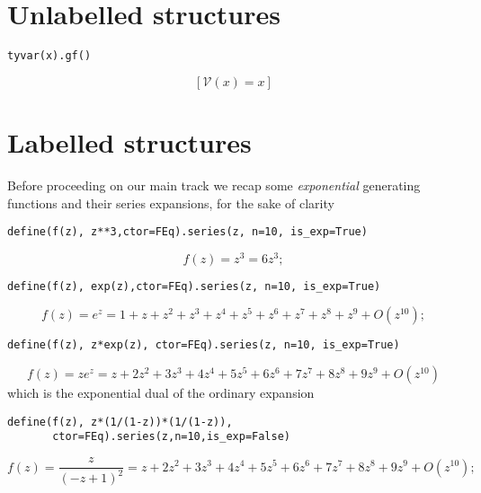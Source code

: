 \section{Unlabelled structures}

\begin{verbatim}
tyvar(x).gf()
\end{verbatim}
\begin{displaymath}
\left [ \mathcal{V}{\left (x \right )} = x\right ]
\end{displaymath}

\section{Labelled structures}

Before proceeding on our main track we recap some \emph{exponential} generating
functions and their series expansions, for the sake of clarity

\begin{verbatim}
define(f(z), z**3,ctor=FEq).series(z, n=10, is_exp=True)
\end{verbatim}
\begin{displaymath}
f{\left (z \right )} = z^{3} = 6 z^{3};
\end{displaymath}

\begin{verbatim}
define(f(z), exp(z),ctor=FEq).series(z, n=10, is_exp=True)
\end{verbatim}
\begin{displaymath}
f{\left (z \right )} = e^{z} = 1 + z + z^{2} + z^{3} + z^{4} + z^{5} + z^{6} + z^{7} + z^{8} + z^{9} + O\left(z^{10}\right);
\end{displaymath}

\begin{verbatim}
define(f(z), z*exp(z), ctor=FEq).series(z, n=10, is_exp=True)
\end{verbatim}
\begin{displaymath}
f{\left (z \right )} = z e^{z} = z + 2 z^{2} + 3 z^{3} + 4 z^{4} + 5 z^{5} + 6 z^{6} + 7 z^{7} + 8 z^{8} + 9 z^{9} + O\left(z^{10}\right)
\end{displaymath}
which is the exponential dual of the ordinary expansion
\begin{verbatim}
define(f(z), z*(1/(1-z))*(1/(1-z)),
       ctor=FEq).series(z,n=10,is_exp=False)
\end{verbatim}
\begin{displaymath}
f{\left (z \right )} = \frac{z}{\left(- z + 1\right)^{2}} = z + 2 z^{2} + 3 z^{3} + 4 z^{4} + 5 z^{5} + 6 z^{6} + 7 z^{7} + 8 z^{8} + 9 z^{9} + O\left(z^{10}\right);
\end{displaymath}

